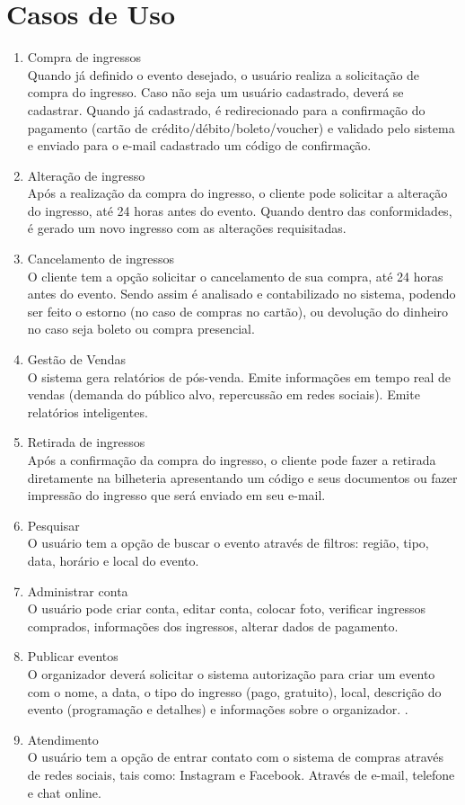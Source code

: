 \documentclass[12pt]{article}
\begin{document}
\section{Casos de Uso}
    \begin{enumerate}
        \item Compra de ingressos \\
        Quando já definido o evento desejado, o usuário realiza a solicitação de compra do ingresso. Caso não seja um usuário cadastrado, deverá se cadastrar. Quando já cadastrado, é redirecionado para a confirmação do pagamento (cartão de crédito/débito/boleto/voucher) e validado pelo sistema e enviado para o e-mail cadastrado um código de confirmação.
        \item Alteração de ingresso \\
        Após a realização da compra do ingresso, o cliente pode solicitar a alteração do ingresso, até 24 horas antes do evento. Quando dentro das conformidades, é gerado um novo ingresso com as alterações requisitadas.
        \item Cancelamento de ingressos \\
        O cliente tem a opção solicitar o cancelamento de sua compra, até 24 horas antes do evento. Sendo assim é analisado e contabilizado no sistema, podendo ser feito o estorno (no caso de compras no cartão), ou devolução do dinheiro no caso seja boleto ou compra presencial.
        \item Gestão de Vendas \\
        O sistema gera relatórios de pós-venda. Emite informações em tempo real de vendas (demanda do público alvo, repercussão em redes sociais). Emite relatórios inteligentes. 
        \item Retirada de ingressos \\
        Após a confirmação da compra do ingresso, o cliente pode fazer a retirada diretamente na bilheteria apresentando um código e seus documentos ou fazer impressão do ingresso que será enviado em seu e-mail.
        \item Pesquisar \\
         O usuário tem a opção de buscar o evento através de filtros: região, tipo, data, horário e local do evento.
        \item Administrar conta \\
        O usuário pode criar conta, editar conta, colocar foto, verificar ingressos comprados, informações dos ingressos, alterar dados de pagamento.
        \item Publicar eventos \\
        O organizador deverá solicitar o sistema autorização para criar um evento com o nome, a data, o tipo do ingresso (pago, gratuito), local, descrição do evento (programação e detalhes) e informações sobre o organizador. . 
        \item Atendimento \\
        O usuário tem a opção de entrar contato com o sistema de compras através de redes sociais, tais como: Instagram e Facebook. Através de e-mail, telefone e chat online.  
    \end{enumerate}
\end{document}
